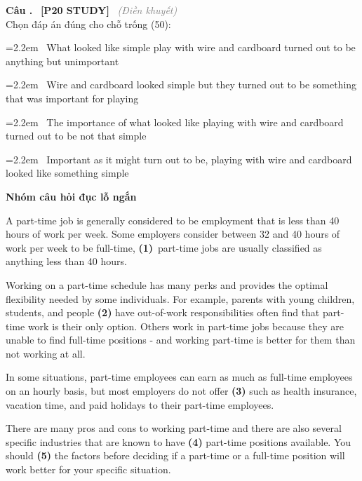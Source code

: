 \documentclass[12pt,a4paper,twoside]{article}
\newcounter{qcounter}
\newcommand{\question}[2][]{%
    \stepcounter{qcounter}%
    \par\vspace{6pt}%
    \noindent\textcolor{primaryBlue}{\textbf{Câu \theqcounter.}}~%
    \textcolor{secondaryBlue}{\small\textbf{[P20 STUDY]}}~%
    \if\relax\detokenize{#1}\relax\else\textcolor{gray}{\small\textit{(#1)}}~\fi\\[1pt]
    \noindent #2%
}
\newcommand{\choiceitem}[2]{%
    \tikz[baseline=-0.5ex]{%
        \node[draw=primaryBlue, circle, minimum size=1.5em, inner sep=0pt, thick] {\textbf{#1}};%
    }~#2%
}
\newenvironment{readingpassage}[1][]{%
    \begin{tcolorbox}[enhanced, colback=grayLight, colframe=secondaryBlue,
        coltitle=textDark, fonttitle=\bfseries, title={#1},
        rounded corners, arc=3mm, boxrule=1pt,
        left=15pt, right=15pt, top=10pt, bottom=10pt,
        breakable, before skip=10pt, after skip=10pt, drop fuzzy shadow]
    \setstretch{1.3}
}{\end{tcolorbox}}
\begin{document}
\question[Điền khuyết]{Chọn đáp án đúng cho chỗ trống (50):}

\par\vspace{4pt}
\noindent\hangindent=2.2em\choiceitem{A}{What looked like simple play with wire and cardboard turned out to be anything but unimportant}\par\vspace{4pt}
\noindent\hangindent=2.2em\choiceitem{B}{Wire and cardboard looked simple but they turned out to be something that was important for playing}\par\vspace{4pt}
\noindent\hangindent=2.2em\choiceitem{C}{The importance of what looked like playing with wire and cardboard turned out to be not that simple}\par\vspace{4pt}
\noindent\hangindent=2.2em\choiceitem{D}{Important as it might turn out to be, playing with wire and cardboard looked like something simple}\par\vspace{4pt}

\setcounter{qcounter}{0}
\begin{groupbox}\textbf{\large Nhóm câu hỏi đục lỗ ngắn}\end{groupbox}
\begin{readingpassage}[]
A part-time job is generally considered to be employment that is less than 40 hours of work per week. Some employers consider between 32 and 40 hours of work per week to be full-time, \textbf{(1)} part-time jobs are usually classified as anything less than 40 hours.

Working on a part-time schedule has many perks and provides the optimal flexibility needed by some individuals. For example, parents with young children, students, and people \textbf{(2)} have out-of-work responsibilities often find that part-time work is their only option. Others work in part-time jobs because they are unable to find full-time positions - and working part-time is better for them than not working at all.

In some situations, part-time employees can earn as much as full-time employees on an hourly basis, but most employers do not offer \textbf{(3)} such as health insurance, vacation time, and paid holidays to their part-time employees.

There are many pros and cons to working part-time and there are also several specific industries that are known to have \textbf{(4)} part-time positions available. You should \textbf{(5)} the factors before deciding if a part-time or a full-time position will work better for your specific situation.
\end{readingpassage}
\end{document}
